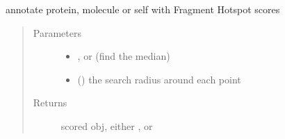 \documentclass[letterpaper,10pt,english]{sphinxmanual}
\begin{document}
\begin{fulllineitems}
\begin{fulllineitems}
\begin{quote}
\begin{description}
\end{description}\end{quote}

\end{fulllineitems}


\begin{fulllineitems}
\label{\detokenize{result_api:hotspots.result.Results.score}}
annotate protein, molecule or self with Fragment Hotspot scores
\begin{quote}\begin{description}
\item[{Parameters}] \leavevmode\begin{itemize}
\item {} 
 \textendash{} ,  or  (find the median)

\item {} 
 () \textendash{} the search radius around each point

\end{itemize}

\item[{Returns}] \leavevmode
scored obj, either ,  or 

\end{description}\end{quote}

\begin{sphinxVerbatim}[commandchars=\\\{\}]
          
\end{sphinxVerbatim}


\end{fulllineitems}
\end{fulllineitems}
\end{document}
